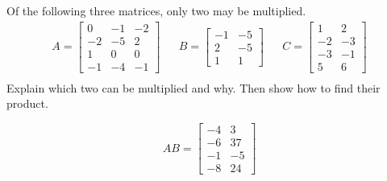 
\begin{exerciseStatement}


Of the following three matrices, only two may be multiplied. 
\begin{align*} A= \left[\begin{array}{ccc}
0 & -1 & -2 \\
-2 & -5 & 2 \\
1 & 0 & 0 \\
-1 & -4 & -1
\end{array}\right]  & & B= \left[\begin{array}{cc}
-1 & -5 \\
2 & -5 \\
1 & 1
\end{array}\right]  & & C= \left[\begin{array}{cc}
1 & 2 \\
-2 & -3 \\
-3 & -1 \\
5 & 6
\end{array}\right]  \\ \end{align*}
             Explain which two can be multiplied and why. Then show how to find their product.


\end{exerciseStatement}
    
\begin{exerciseAnswer} 
\[AB= \left[\begin{array}{cc}
-4 & 3 \\
-6 & 37 \\
-1 & -5 \\
-8 & 24
\end{array}\right] \]
\end{exerciseAnswer}
    
